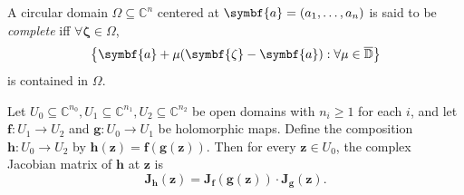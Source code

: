 \begin{definition}\label{def:completecirculardomain}
    A circular domain \(\Omega\subseteq\mathbb{C}^n\) centered at \(\symbf{a}=\qty(a_1,\ldots,a_n)\) is said to be \textit{complete} iff \(\forall\symbf{\zeta}\in\Omega\), \[\cbraces{\symbf{a}+\mu\qty(\symbf{\zeta}-\symbf{a})}{\forall\mu\in\overline{\mathbb{D}}}\] is contained in \(\Omega\).
\end{definition}
\begin{proposition}\label{prop:jacobianchainrule}
    Let \(U_0\subseteq\mathbb{C}^{n_0}, U_1\subseteq\mathbb{C}^{n_1}, U_2\subseteq\mathbb{C}^{n_2}\) be open domains with \(n_i\geq 1\) for each \(i\), and let \(\symbf{f}:U_1\to U_2\) and \(\symbf{g}:U_0\to U_1\) be holomorphic maps. Define the composition \(\symbf{h}:U_0\to U_2\) by \(\symbf{h}(\symbf{z})=\symbf{f}(\symbf{g}(\symbf{z}))\). Then for every \(\symbf{z}\in U_0\), the complex Jacobian matrix of \(\symbf{h}\) at \(\symbf{z}\) is
    \[\symbf{J}_{\symbf{h}}(\symbf{z})=\symbf{J}_{\symbf{f}}(\symbf{g}(\symbf{z}))\cdot\symbf{J}_{\symbf{g}}(\symbf{z}).\]
\end{proposition}
